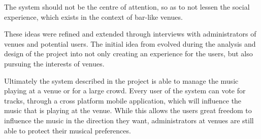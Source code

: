 The system should not be the centre of attention, so as to not lessen the social experience, which exists in the context of bar-like venues.

These ideas were refined and extended through interviews with administrators of venues and potential users. The initial idea from  evolved during the analysis and design of the project into not only creating an experience for the users, but also pursuing the interests of venues.

Ultimately the system described in the project is able to manage the music playing at a venue or for a large crowd. Every user of the system can vote for tracks, through a cross platform mobile application, which will influence the music that is playing at the venue. While this allows the users great freedom to influence the music in the direction they want, administrators at venues are still able to protect their musical preferences.
